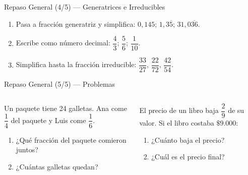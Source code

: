 \documentclass[aspectratio=169]{beamer}
\begin{document}
\begin{frame}{Repaso General \textnormal{(4/5)} — Generatrices e Irreducibles}
  \begin{mwejercicio}
    \begin{enumerate}
      \item Pasa a fracción generatriz y simplifica: $0{,}145$;\;
            $1{,}3\overline{5}$;\; $31{,}0\overline{36}$.
      \item Escribe como número decimal: $\dfrac{4}{3}$;\;
            $\dfrac{5}{6}$;\; $\dfrac{1}{10}$.
      \item Simplifica hasta la fracción irreducible:
            $\dfrac{33}{27}$,\; $\dfrac{22}{72}$,\; $\dfrac{42}{54}$.
    \end{enumerate}
  \end{mwejercicio}
\end{frame}

\begin{frame}{Repaso General \textnormal{(5/5)} — Problemas}
  \begin{columns}[T]
    \begin{mwejercicio}
      Un paquete tiene 24 galletas. Ana come $\dfrac{1}{4}$ del
      paquete y Luis come $\dfrac{1}{6}$.
      \begin{enumerate}
        \item ¿Qué fracción del paquete comieron juntos?
        \item ¿Cuántas galletas quedan?
      \end{enumerate}
    \end{mwejercicio}
    \begin{mwejercicio}
      El precio de un libro baja $\dfrac{2}{9}$ de su valor. Si el
      libro costaba $\$9.000$:
      \begin{enumerate}
        \item ¿Cuánto baja el precio?
        \item ¿Cuál es el precio final?
      \end{enumerate}
    \end{mwejercicio}
  \end{columns}
\end{frame}
\end{document}
